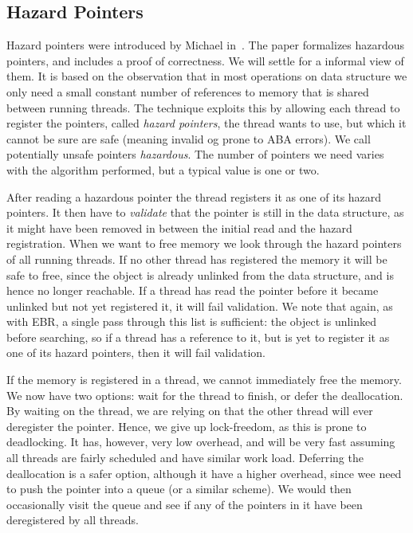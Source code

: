 \subsection{Hazard Pointers\label{sec:background-hazard}}

Hazard pointers were introduced by Michael in~\cite{michael2004hazard}.  The paper formalizes
hazardous pointers, and includes a proof of correctness. We will settle for a informal view of
them. It is based on the observation that in most operations on data structure we only need a small
constant number of references to memory that is shared between running threads. The technique
exploits this by allowing each thread to register the pointers, called \emph{hazard pointers}, the
thread wants to use, but which it cannot be sure are safe (meaning invalid og prone to ABA errors).
We call potentially unsafe pointers \emph{hazardous}. The number of pointers we need varies with
the algorithm performed, but a typical value is one or two.

After reading a hazardous pointer the thread registers it as one of its hazard pointers. It then
have to \emph{validate} that the pointer is still in the data structure, as it might have been
removed in between the initial read and the hazard registration. When we want to free memory we
look through the hazard pointers of all running threads. If no other thread has registered the
memory it will be safe to free, since the object is already unlinked from the data structure, and
is hence no longer reachable. If a thread has read the pointer before it became unlinked but not
yet registered it, it will fail validation.  We note that again, as with EBR, a single pass through
this list is sufficient: the object is unlinked before searching, so if a thread has a reference to
it, but is yet to register it as one of its hazard pointers, then it will fail validation.

If the memory is registered in a thread, we cannot immediately free the memory.  We now have two
options: wait for the thread to finish, or defer the deallocation.  By waiting on the thread, we
are relying on that the other thread will ever deregister the pointer. Hence, we give up
lock-freedom, as this is prone to deadlocking. It has, however, very low overhead, and will be very
fast assuming all threads are fairly scheduled and have similar work load.  Deferring the
deallocation is a safer option, although it have a higher overhead, since wee need to push the
pointer into a queue (or a similar scheme). We would then occasionally visit the queue and see if
any of the pointers in it have been deregistered by all threads.

